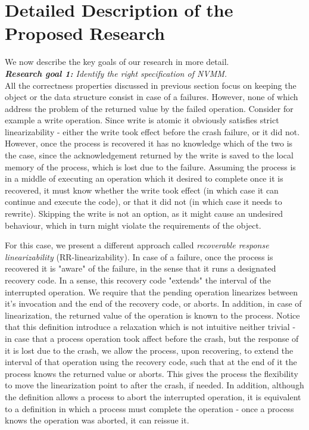 \documentclass[11pt]{article}
\begin{document}
\section{Detailed Description of the Proposed Research}

We now describe the key goals of our research in more detail. \\

\noindent \emph{{\bf Research goal 1:} Identify the right specification
	of NVMM.}\\
All the correctness properties discussed in previous section focus on keeping the object or the data structure consist in case of a failures. However, none of which address the problem of the returned value by the failed operation. Consider for example a write operation. Since write is atomic it obviously satisfies strict linearizability - either the write took effect before the crash failure, or it did not. However, once the process is recovered it has no knowledge which of the two is the case, since the acknowledgement returned by the write is saved to the local memory of the process, which is lost due to the failure. Assuming the process is in a middle of executing an operation which it desired to complete once it is recovered, it must know whether the write took effect (in which case it can continue and execute the code), or that it did not (in which case it needs to rewrite). Skipping the write is not an option, as it might cause an undesired behaviour, which in turn might violate the requirements of the object.

For this case, we present a different approach called \emph{recoverable response linearizability} (RR-linearizability). In case of a failure, once the process is recovered it is "aware" of the failure, in the sense that it runs a designated recovery code. In a sense, this recovery code "extends" the interval of the interrupted operation. We require that the pending operation linearizes between it's invocation and the end of the recovery code, or aborts. In addition, in case of linearization, the returned value of the operation is known to the process. Notice that this definition introduce a relaxation which is not intuitive neither trivial - in case that a process operation took affect before the crash, but the response of it is lost due to the crash, we allow the process, upon recovering, to extend the interval of that operation using the recovery code, such that at the end of it the process knows the returned value or aborts. This gives the process the flexibility to move the linearization point to after the crash, if needed. In addition, although the definition allows a process to abort the interrupted operation, it is equivalent to a definition in which a process must complete the operation - once a process knows the operation was aborted, it can reissue it.
\end{document}
